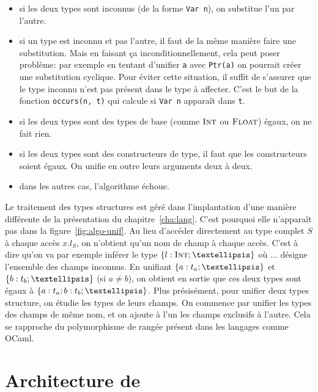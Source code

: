 \begin{itemize}

\item si les deux types sont inconnus (de la forme \texttt{Var n}), on substitue
l'un par l'autre.

\item si un type est inconnu et pas l'autre, il faut de la même manière faire
une substitution.
Mais en faisant ça inconditionnellement, cela peut poser problème:
par exemple en tentant d'unifier \texttt{a} avec \verb!Ptr(a)! on pourrait
créer une substitution cyclique.
Pour éviter cette situation, il suffit de s'assurer que le type inconnu n'est
pas présent dans le type à affecter. C'est le but de la fonction
\texttt{occurs(n, t)} qui calcule si \texttt{Var n} apparaît dans \texttt{t}.

\item si les deux types sont des types de base (comme $\textsc{Int}$ ou $\textsc{Float}$)
égaux, on ne fait rien.

\item si les deux types sont des constructeurs de type, il faut que les
constructeurs soient égaux. On unifie en outre leurs arguments deux à deux.

\item dans les autres cas, l'algorithme échoue.

\end{itemize}

Le traitement des types structures est géré dans l'implantation d'une manière
différente de la présentation du chapitre~\ref{cha:lang}. C'est pourquoi elle
n'apparaît pas dans la figure~\ref{fig:algo-unif}. Au lieu d'accéder directement
au type complet $S$ à chaque accès $x.l_S$, on n'obtient qu'un nom de champ à
chaque accès. C'est à dire qu'on va par exemple inférer le type $\tStruct{ l:
\tInt ; … }$ où $…$ désigne l'ensemble des champs inconnus. En unifiant
$\tStruct{ a: t_a ; … }$ et $\tStruct{ b: t_b ; … }$ (si $a ≠ b$), on obtient
en sortie que ces deux types sont égaux à $\tStruct{ a: t_a; b: t_b ; … }$.
Plus présisément, pour unifier deux types structure, on étudie les types de
leurs champs. On commence par unifier les types des champs de même nom, et on
ajoute à l'un les champs exclusifs à l'autre. Cela se rapproche du polymorphisme
de rangée présent dans les langages comme OCaml.

\section{Architecture de \ptrtype}
\label{sec:ptrtype-archi}


